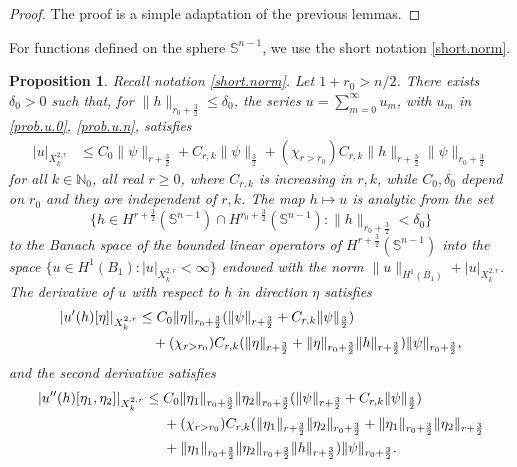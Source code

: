 \documentclass[10pt,reqno,a4paper]{article}
\numberwithin{equation}{section}
\theoremstyle{plain}
\newtheorem{proposition}[theorem]{Proposition}
\theoremstyle{definition}
\newcommand{\N}{{\mathbb N}}
\renewcommand{\S}{{\mathbb S}}
\begin{document}
\begin{proof} The proof is a simple adaptation of the previous lemmas. 
\end{proof}

For functions defined on the sphere $\S^{n-1}$, 
we use the short notation \eqref{short.norm}.


\begin{proposition} \label{prop:u}
Recall notation \eqref{short.norm}. 
Let $1+r_0 > n/2$. 
There exists $\delta_0 > 0$ such that, 
for $\| h \|_{r_0+\frac32} \leq \delta_0$,
the series $u = \sum_{m=0}^\infty u_m$, 
with $u_m$ in \eqref{prob.u.0}, \eqref{prob.u.n}, 
satisfies 
\begin{align} 
|u|_{X^{2,r}_k} 
& \leq C_0 \| \psi \|_{r+\frac32}
+ C_{r,k} \| \psi \|_{\frac32}
+ (\chi_{r > r_0}) C_{r,k} \| h \|_{r+\frac32} \| \psi \|_{r_0 + \frac32}
\label{echin.60}
\end{align}
for all $k \in \N_0$, all real $r \geq 0$, 
where $C_{r,k}$ is increasing in $r,k$, 
while $C_0, \delta_0$ depend on $r_0$ and they are independent of $r,k$.
The map $h \mapsto u$ is analytic from the set 
\[
\{ h \in H^{r+\frac32}(\S^{n-1}) \cap H^{r_0+\frac32}(\S^{n-1}) 
: \| h \|_{r_0+\frac32} < \delta_0 \}
\] 
to the Banach space of the bounded linear operators  
of $H^{r+\frac32}(\S^{n-1})$ 
into the space $\{ u \in H^1(B_1) : |u|_{X^{2,r}_k} < \infty \}$ 
endowed with the norm $\| u \|_{H^1(B_1)} + | u |_{X^{2,r}_k}$.  
The derivative of $u$ with respect to $h$ in direction $\eta$ satisfies 
\begin{align} 
|u'(h)[\eta]|_{X^{2,r}_k} 
& \leq C_0 \| \eta \|_{r_0+\frac32}
( \| \psi \|_{r+\frac32} + C_{r,k} \| \psi \|_{\frac32} )
\notag \\ & \quad 
+ (\chi_{r > r_0}) C_{r,k} ( \| \eta \|_{r+\frac32} 
+ \| \eta \|_{r_0+\frac32} \| h \|_{r+\frac32} ) \| \psi \|_{r_0 + \frac32},
\label{echin.60.lin}
\end{align}
and the second derivative satisfies 
\begin{align}
| u''(h)[\eta_1, \eta_2] |_{X^{2,r}_k} 
& \leq C_0 \| \eta_1 \|_{r_0+\frac32} \| \eta_2 \|_{r_0+\frac32}
( \| \psi \|_{r+\frac32} + C_{r,k} \| \psi \|_{\frac32} )
\notag \\ & \quad \  
+ (\chi_{r > r_0}) C_{r,k} ( \| \eta_1 \|_{r+\frac32} \| \eta_2 \|_{r_0+\frac32} 
+ \| \eta_1 \|_{r_0+\frac32} \| \eta_2 \|_{r+\frac32}
\notag\\ & \quad \ 
+ \| \eta_1 \|_{r_0+\frac32} \| \eta_2 \|_{r_0+\frac32} \| h \|_{r+\frac32} )
\| \psi \|_{r_0+\frac32}.
\label{echin.60.second.der}
\end{align}
\end{proposition}
\end{document}
